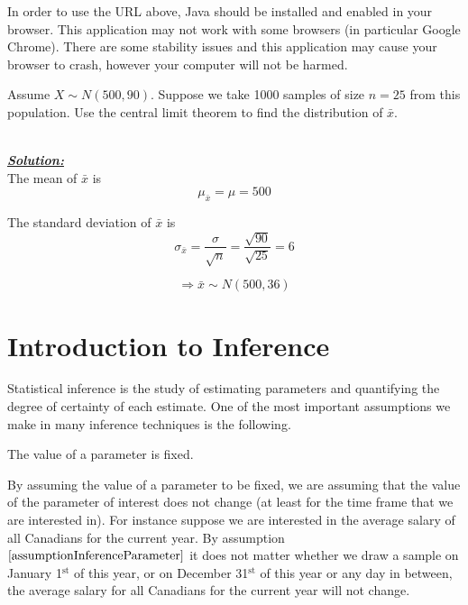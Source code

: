 \begin{nt}
In order to use the URL above, Java should be installed and enabled in your browser. This application may not work with some browsers (in particular Google Chrome). There are some stability issues and this application may cause your browser to crash, however your computer will not be harmed.
\end{nt}

\begin{example}
Assume $X \sim N(500,90)$. Suppose we take 1000 samples of size $n=25$ from this population. 
Use the central limit theorem to find the distribution of $\bar{x}$.

\hfill\\
{\emph{\textbf{\underline{Solution:}}}}\\


The mean of $\bar{x}$ is
\[ \mu_{\bar{x}}=\mu=500 \]

The standard deviation of $\bar{x}$ is
\[ \sigma_{\bar{x}} = \frac{\sigma}{\sqrt{n}} = \frac{\sqrt{90}}{\sqrt{25}} =6\]

\[\Rightarrow \bar{x} \sim N (500, 36) \]
\end{example}




\section{Introduction to Inference}
\label{sectionIntroToInference}

Statistical inference is the study of estimating parameters and quantifying the degree of certainty of each estimate. One of the most important assumptions we make in many inference techniques is the following.

\begin{assumption}
\label{assumptionInferenceParameter}
The value of a parameter is fixed.
\end{assumption}

By assuming the value of a parameter to be fixed, we are assuming that the value of the parameter of interest does not change (at least for the time frame that we are interested in). For instance suppose we are interested in the average salary of all Canadians for the current year. By assumption $\ref{assumptionInferenceParameter}$ it does not matter whether we draw a sample on January 1$^{\text{st}}$ of this year, or on December 31$^{\text{st}}$ of this year or any day in between, the average salary for all Canadians for the current year will not change.\\

